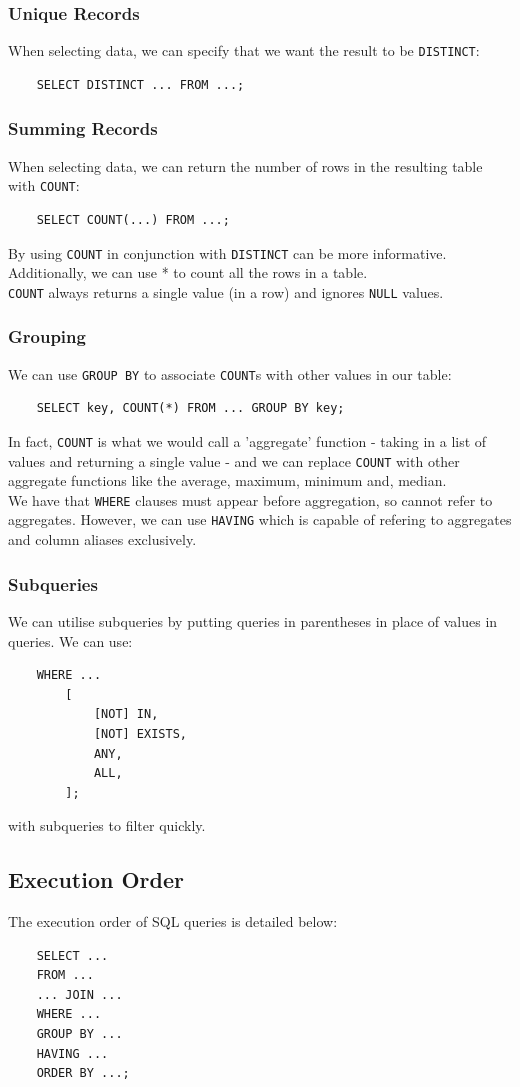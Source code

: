 \subsubsection{Unique Records}

When selecting data, we can specify that we want the result
to be \texttt{DISTINCT}: \begin{lstlisting}
    SELECT DISTINCT ... FROM ...;
\end{lstlisting}

\subsubsection{Summing Records}

When selecting data, we can return the number of rows
in the resulting table with \texttt{COUNT}: \begin{lstlisting}
    SELECT COUNT(...) FROM ...;
\end{lstlisting} By using \texttt{COUNT} in conjunction
with \texttt{DISTINCT} can be more informative.
Additionally, we can use * to count all the rows in a table.
\\[\baselineskip]
\texttt{COUNT} always returns a single value (in a row) and
ignores \texttt{NULL} values.

\subsubsection{Grouping}

We can use \texttt{GROUP BY} to associate \texttt{COUNT}s
with other values in our table: \begin{lstlisting}
    SELECT key, COUNT(*) FROM ... GROUP BY key;
\end{lstlisting} In fact, \texttt{COUNT} is what we would
call a 'aggregate' function - taking in a list of values
and returning a single value - and we can replace \texttt{COUNT}
with other aggregate functions like the average, maximum, minimum
and, median.
\\[\baselineskip]
We have that \texttt{WHERE} clauses must appear before
aggregation, so cannot refer to aggregates. However,
we can use \texttt{HAVING} which is capable of refering to
aggregates and column aliases exclusively.

\subsubsection{Subqueries}

We can utilise subqueries by putting queries in
parentheses in place of values in queries. We can
use: \begin{lstlisting}
    WHERE ...
        [
            [NOT] IN,
            [NOT] EXISTS,
            ANY,
            ALL,
        ];
\end{lstlisting} with subqueries to filter quickly.

\subsection{Execution Order}

The execution order of SQL queries is detailed below:
\begin{lstlisting}
    SELECT ...
    FROM ...
    ... JOIN ... 
    WHERE ...
    GROUP BY ...
    HAVING ...
    ORDER BY ...;
\end{lstlisting}

